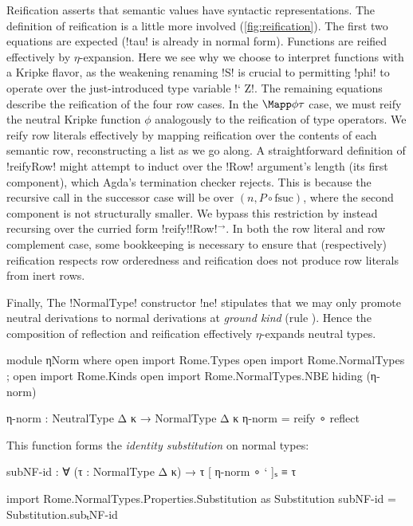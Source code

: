 Reification asserts that semantic values have syntactic representations. The definition of reification is a little more involved (\cref{fig:reification}). The first two equations are expected (!tau! is already in normal form). Functions are reified effectively by $\eta$\--expan\-sion. Here we see why we choose to interpret functions with a Kripke flavor, as the weakening renaming !S! is crucial to permitting !phi! to operate over the just-introduced type variable !` Z!. The remaining equations describe the reification of the four row cases. In the $\Mapp \phi \tau$ case, we must reify the neutral Kripke function $\phi$ analogously to the reification of type operators. We reify row literals effectively by mapping reification over the contents of each semantic row, reconstructing a list as we go along. A straightforward definition of !reifyRow! might attempt to induct over the !Row! argument's length (its first component), which Agda's termination checker rejects. This is because the recursive call in the successor case will be over $(n , P \circ \text{fsuc})$, where the second component is not structurally smaller. We bypass this restriction by instead recursing over the curried form !reify!!Row!$^{\to}$. In both the row literal and row complement case, some bookkeeping is necessary to ensure that (respectively) reification respects row orderedness and reification does not produce row literals from inert rows.

Finally, The !NormalType! constructor !ne! stipulates that we may only promote neutral derivations to normal derivations at \emph{ground kind} (rule ). Hence the composition of reflection and reification effectively $\eta$-expands neutral types.

\begin{code}[hide]
module ηNorm where 
  open import Rome.Types
  open import Rome.NormalTypes ; open import Rome.Kinds 
  open import Rome.NormalTypes.NBE hiding (η-norm)
\end{code}
\begin{code}
  η-norm : NeutralType Δ κ → NormalType Δ κ 
  η-norm = reify ∘ reflect
\end{code}

\Ni This function forms the \emph{identity substitution} on normal types:

\begin{code}
  subNF-id : ∀ (τ : NormalType Δ κ) → τ [ η-norm ∘ ` ]ₛ ≡ τ 
\end{code}
\begin{code}[hide]
  import Rome.NormalTypes.Properties.Substitution as Substitution
  subNF-id = Substitution.subₜNF-id
\end{code}

